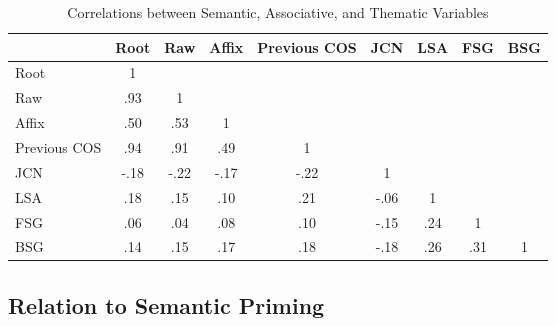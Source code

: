 \documentclass[english,man]{apa6}
\theoremstyle{definition}
\theoremstyle{definition}
\theoremstyle{definition}
\theoremstyle{remark}
\begin{document}
\begin{table}[tbp]
\begin{center}
\begin{threeparttable}
\caption{\label{tab:correlation-table}Correlations between Semantic, Associative, and Thematic Variables}
\begin{tabular}{lcccccccc}
\toprule
  & Root & Raw & Affix & Previous COS & JCN & LSA & FSG & BSG\\
\midrule
Root & 1 &  &  &  &  &  &  & \\
Raw & .93 & 1 &  &  &  &  &  & \\
Affix & .50 & .53 & 1 &  &  &  &  & \\
Previous COS & .94 & .91 & .49 & 1 &  &  &  & \\
JCN & -.18 & -.22 & -.17 & -.22 & 1 &  &  & \\
LSA & .18 & .15 & .10 & .21 & -.06 & 1 &  & \\
FSG & .06 & .04 & .08 & .10 & -.15 & .24 & 1 & \\
BSG & .14 & .15 & .17 & .18 & -.18 & .26 & .31 & 1\\
\bottomrule
\end{tabular}
\end{threeparttable}
\end{center}
\end{table}

\subsection{Relation to Semantic
Priming}\label{relation-to-semantic-priming}
\end{document}
